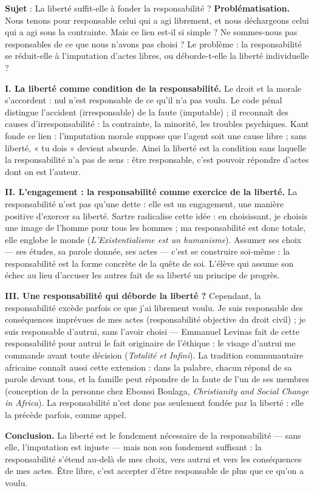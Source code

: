 \documentclass[11pt]{article}
\begin{document}
\begin{exoresolu}
\textbf{Sujet} : La liberté suffit-elle à fonder la responsabilité ?
\tcblower
\textbf{Problématisation.} Nous tenons pour responsable celui qui a agi librement, et nous déchargeons celui qui a agi sous la contrainte. Mais ce lien est-il si simple ? Ne sommes-nous pas responsables de ce que nous n'avons pas choisi ? Le problème : la responsabilité se réduit-elle à l'imputation d'actes libres, ou déborde-t-elle la liberté individuelle ?

\textbf{I. La liberté comme condition de la responsabilité.}
Le droit et la morale s'accordent : nul n'est responsable de ce qu'il n'a pas voulu. Le code pénal distingue l'accident (irresponsable) de la faute (imputable) ; il reconnaît des causes d'irresponsabilité : la contrainte, la minorité, les troubles psychiques. Kant fonde ce lien : l'imputation morale suppose que l'agent soit une cause libre ; sans liberté, « tu dois » devient absurde. Ainsi la liberté est la condition sans laquelle la responsabilité n'a pas de sens : être responsable, c'est pouvoir répondre d'actes dont on est l'auteur.

\textbf{II. L'engagement : la responsabilité comme exercice de la liberté.}
La responsabilité n'est pas qu'une dette : elle est un engagement, une manière positive d'exercer sa liberté. Sartre radicalise cette idée : en choisissant, je choisis une image de l'homme pour tous les hommes ; ma responsabilité est donc totale, elle englobe le monde (\emph{L'Existentialisme est un humanisme}). Assumer ses choix — ses études, sa parole donnée, ses actes — c'est se construire soi-même : la responsabilité est la forme concrète de la quête de soi. L'élève qui assume son échec au lieu d'accuser les autres fait de sa liberté un principe de progrès.

\textbf{III. Une responsabilité qui déborde la liberté ?}
Cependant, la responsabilité excède parfois ce que j'ai librement voulu. Je suis responsable des conséquences imprévues de mes actes (responsabilité objective du droit civil) ; je suis responsable d'autrui, sans l'avoir choisi — Emmanuel Levinas fait de cette responsabilité pour autrui le fait originaire de l'éthique : le visage d'autrui me commande avant toute décision (\emph{Totalité et Infini}). La tradition communautaire africaine connaît aussi cette extension : dans la palabre, chacun répond de sa parole devant tous, et la famille peut répondre de la faute de l'un de ses membres (conception de la personne chez Eboussi Boulaga, \emph{Christianity and Social Change in Africa}). La responsabilité n'est donc pas seulement fondée par la liberté : elle la précède parfois, comme appel.

\textbf{Conclusion.} La liberté est le fondement nécessaire de la responsabilité — sans elle, l'imputation est injuste — mais non son fondement suffisant : la responsabilité s'étend au-delà de mes choix, vers autrui et vers les conséquences de mes actes. Être libre, c'est accepter d'être responsable de plus que ce qu'on a voulu.
\end{exoresolu}
\end{document}
